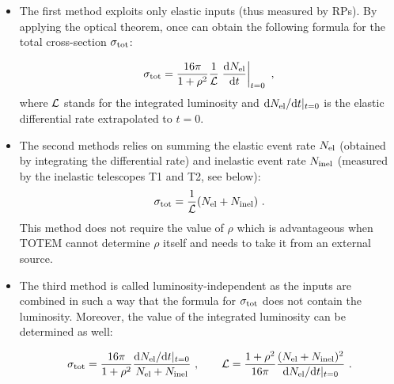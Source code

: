 \documentclass{desyproc}
\def\d{{\rm d}}
\begin{document}
\begin{itemize}

\item The first method exploits only elastic inputs (thus measured by RPs). By applying the optical theorem, once can obtain the following formula for the total cross-section $\sigma_{\rm tot}$:

\begin{equation}\label{eq:si tot m1}
\sigma_{\rm tot} = {16\pi\over 1+\rho^2} {1\over {\cal L}} \left. {\d N_{\rm el}\over \d t}\right |_{t = 0}\ ,
\end{equation}
where ${\cal L}$ stands for the integrated luminosity and $\d N_{\rm el}/\d t|_{t = 0}$ is the elastic differential rate extrapolated to $t = 0$.

\item The second methods relies on summing the elastic event rate $N_{\rm el}$ (obtained by integrating the differential rate) and inelastic event rate $N_{\rm inel}$ (measured by the inelastic telescopes T1 and T2, see below):
\begin{equation}\label{eq:si tot m2}
\sigma_{\rm tot} = {1\over {\cal L}} (N_{\rm el} + N_{\rm inel})\ .
\end{equation}
This method does not require the value of $\rho$ which is advantageous when TOTEM cannot determine $\rho$ itself and needs to take it from an external source.

\item The third method is called luminosity-independent as the inputs are combined in such a way that the formula for $\sigma_{\rm tot}$ does not contain the luminosity. Moreover, the value of the integrated luminosity can be determined as well:

\begin{equation}\label{eq:si tot m3}
\sigma_{\rm tot} = {16\pi\over 1+\rho^2} {\d N_{\rm el}/ \d t |_{t = 0}\over N_{\rm el} + N_{\rm inel} }\ ,\qquad
{\cal L} = {1+\rho^2\over 16\pi} {( N_{\rm el} + N_{\rm inel})^2 \over \d N_{\rm el}/ \d t |_{t = 0}}\ .
\end{equation}

\end{itemize}
\end{document}
